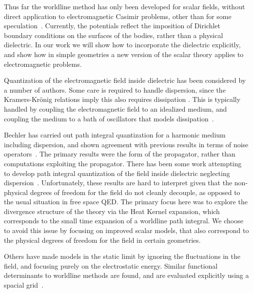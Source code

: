 Thus far the worldline method has only been developed for scalar fields, 
without direct application to electromagnetic Casimir problems, 
other than for some speculation~\cite{Aehlig2011}.
  Currently, the potentials reflect the imposition of Dirichlet boundary 
conditions on the surfaces of the bodies, rather than a physical dielectric.
   In our work we will show how to incorporate the dielectric explicitly, 
and show how in simple geometries a new version of the scalar theory applies
 to electromagnetic problems.  

Quantization of the electromagnetic field inside dielectric has been considered
 by a number of authors.  
Some care is required to handle dispersion, since the Kramers-Kr\"onig relations
 imply this also requires dissipation .  
This is typically handled by coupling the electromagnetic field to an idealized
 medium, and coupling the medium to a bath of oscillators that models
 dissipation~\cite{Huttner1992,Dung1998}.  

Bechler has carried out path integral quantization for a harmonic medium 
including dispersion, and shown agreement with previous results in terms 
of noise operators~\cite{Bechler1999}.  
The primary results were the form of the propagator, 
rather than computations exploiting the propagator.
  There has been some work attempting to develop path integral quantization of
 the field inside dielectric neglecting dispersion~\cite{Bordag1998}.
  Unfortunately, these results are hard to interpret given that the non-physical
 degrees of freedom for the field do not cleanly decouple, as opposed to the 
usual situation in free space QED.
  The primary focus here was to explore the divergence structure of the theory
 via the Heat Kernel expansion, which corresponds to the small time expansion
 of a worldline path integral.
  We choose to avoid this issue by focusing on improved scalar models, 
that also correspond to the physical degrees of freedom for the field in certain geometries.  

Others have made models in the static limit by ignoring the fluctuations in the field,
and focusing purely on the electrostatic energy.
 Similar functional determinants to worldline methods are found,
 and are evaluated explicitly using a spacial grid~\cite{Pasquali2008}.  

